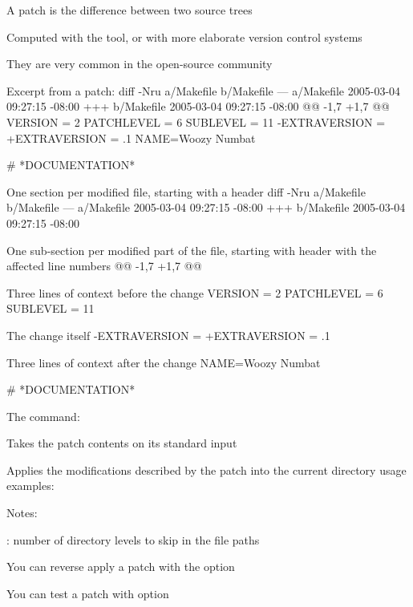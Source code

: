   \startitemize
  \item A patch is the difference between two source trees
    \startitemize
    \item Computed with the  tool, or with more elaborate
      version control systems
    \stopitemize
  \item They are very common in the open-source community
  \item Excerpt from a patch:
  \stopitemize
\starttyping
diff -Nru a/Makefile b/Makefile
--- a/Makefile 2005-03-04 09:27:15 -08:00
+++ b/Makefile 2005-03-04 09:27:15 -08:00
@@ -1,7 +1,7 @@
 VERSION = 2
 PATCHLEVEL = 6
 SUBLEVEL = 11
-EXTRAVERSION =
+EXTRAVERSION = .1
 NAME=Woozy Numbat

 # *DOCUMENTATION*
\stoptyping

  \startitemize
  \item One section per modified file, starting with a header
\starttyping
diff -Nru a/Makefile b/Makefile
--- a/Makefile 2005-03-04 09:27:15 -08:00
+++ b/Makefile 2005-03-04 09:27:15 -08:00
\stoptyping
  \item One sub-section per modified part of the file, starting with
    header with the affected line numbers
\starttyping
@@ -1,7 +1,7 @@
\stoptyping
  \item Three lines of context before the change
\starttyping
 VERSION = 2
 PATCHLEVEL = 6
 SUBLEVEL = 11
\stoptyping
  \item The change itself
\starttyping
-EXTRAVERSION =
+EXTRAVERSION = .1
\stoptyping
    \item Three lines of context after the change
\starttyping
 NAME=Woozy Numbat

 # *DOCUMENTATION*
\stoptyping
    \stopitemize

  The  command:
  \startitemize
  \item Takes the patch contents on its standard input
  \item Applies the modifications described by the patch into the
    current directory
  \stopitemize
   usage examples:
  \startitemize
  \item {}
  \item {}
  \item {}
  \item {}
  \item {}
  \item Notes:
    \startitemize
    \item {}: number of directory levels to skip in the file paths
    \item You can reverse apply a patch with the  option
    \item You can test a patch with  option
    \stopitemize
  \stopitemize

